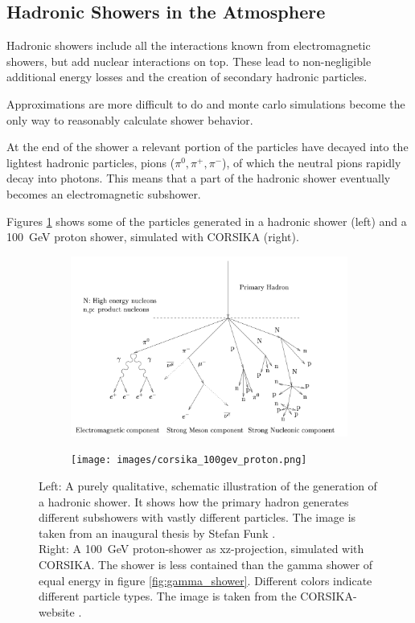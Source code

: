 \subsection{Hadronic Showers in the Atmosphere}
Hadronic showers include all the interactions known from 
electromagnetic showers, but add nuclear interactions on top.
These lead to non-negligible additional energy losses 
and the creation of secondary hadronic particles.

Approximations are more difficult to do and monte carlo simulations 
become the only way to reasonably calculate shower behavior.

At the end of the shower a relevant portion of the particles have decayed into the 
lightest hadronic particles, pions ($\pi^0, \pi^+, \pi^-$), of which the neutral pions 
rapidly decay into photons.
This means that a part of the hadronic shower
eventually becomes an electromagnetic subshower.

Figures \ref{fig:proton_shower}
shows some of the particles generated in a hadronic shower (left)
and a \SI{100}{\giga\electronvolt} proton shower, simulated with CORSIKA (right).

\begin{figure}
	\centering
	\captionsetup{width=0.9\linewidth}
	\begin{subfigure}{.7\textwidth}
  		\centering
  		\includegraphics[width=\linewidth]{images/hadron_shower_illustration.png}
	\end{subfigure}%
	\begin{subfigure}{.2\textwidth}
 		\centering
		\texttt{[image: images/corsika\_100gev\_proton.png]}
	\end{subfigure}
	\caption{
		Left: A purely qualitative,
		schematic illustration of the generation of a hadronic shower.
		It shows how the primary hadron generates different subshowers
		with vastly different particles.
		The image is taken from an inaugural thesis 
		by Stefan Funk \cite{funk_doctor}.\\
		Right: A \SI{100}{\giga\electronvolt} proton-shower as xz-projection,
		simulated with CORSIKA.
		The shower is less contained than the gamma shower of equal energy in 
		figure \ref{fig:gamma_shower}.
		Different colors indicate different particle types.
		The image is taken from 
		the CORSIKA-website \cite{corsika_showers}.}
	\label{fig:proton_shower}
\end{figure}




